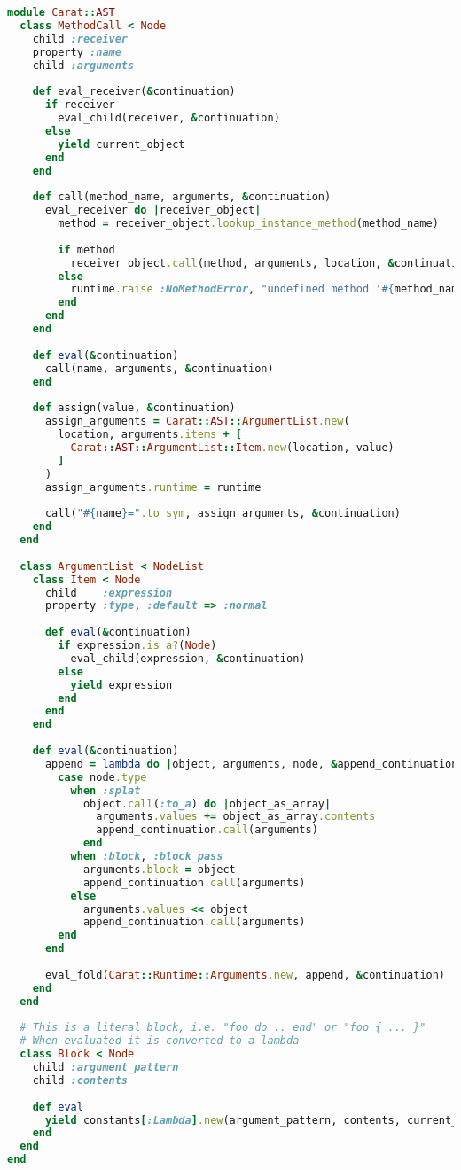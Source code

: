 \begin{lstlisting}[title={\small\ttfamily\bfseries ast/messages.rb},language=Ruby]
module Carat::AST
  class MethodCall < Node
    child :receiver
    property :name
    child :arguments
    
    def eval_receiver(&continuation)
      if receiver
        eval_child(receiver, &continuation)
      else
        yield current_object
      end
    end
    
    def call(method_name, arguments, &continuation)
      eval_receiver do |receiver_object|
        method = receiver_object.lookup_instance_method(method_name)
        
        if method
          receiver_object.call(method, arguments, location, &continuation)
        else
          runtime.raise :NoMethodError, "undefined method '#{method_name}' for object #{receiver_object}", location
        end
      end
    end
    
    def eval(&continuation)
      call(name, arguments, &continuation)
    end
    
    def assign(value, &continuation)
      assign_arguments = Carat::AST::ArgumentList.new(
        location, arguments.items + [
          Carat::AST::ArgumentList::Item.new(location, value)
        ]
      )
      assign_arguments.runtime = runtime
      
      call("#{name}=".to_sym, assign_arguments, &continuation)
    end
  end
  
  class ArgumentList < NodeList
    class Item < Node
      child    :expression
      property :type, :default => :normal
      
      def eval(&continuation)
        if expression.is_a?(Node)
          eval_child(expression, &continuation)
        else
          yield expression
        end
      end
    end
    
    def eval(&continuation)
      append = lambda do |object, arguments, node, &append_continuation|
        case node.type
          when :splat
            object.call(:to_a) do |object_as_array|
              arguments.values += object_as_array.contents
              append_continuation.call(arguments)
            end
          when :block, :block_pass
            arguments.block = object
            append_continuation.call(arguments)
          else
            arguments.values << object
            append_continuation.call(arguments)
        end
      end
      
      eval_fold(Carat::Runtime::Arguments.new, append, &continuation)
    end
  end
  
  # This is a literal block, i.e. "foo do .. end" or "foo { ... }"
  # When evaluated it is converted to a lambda
  class Block < Node
    child :argument_pattern
    child :contents
    
    def eval
      yield constants[:Lambda].new(argument_pattern, contents, current_scope)
    end
  end
end

\end{lstlisting}
